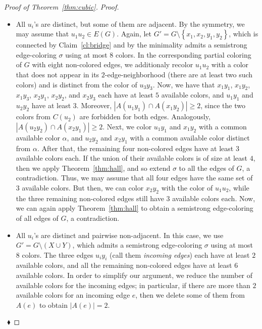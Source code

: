 \documentclass[12pt,a4paper]{article}
\newcommand{\set}[1]{\ensuremath{\left\{#1 \right\}}}
\newenvironment{proofclaim}[1][]%
    {\noindent \emph{Proof.} {}{#1}{}}{$~$\hfill $~\blacklozenge$ \vspace{0.2cm}}
\begin{document}
\begin{proof}[Proof of Theorem~\ref{thm:cubic}]
\begin{proofclaim}
\begin{itemize}
			\item[$(ii)$] All $u_i$'s are distinct, but some of them are adjacent. 
				By the symmetry, we may assume that $u_1u_2 \in E(G)$. 
				Again, let $G'=G \setminus \set{x_1,x_2,y_1,y_2}$, which is connected by Claim~\ref{cl:bridge} 
				and by the minimality admits a semistrong edge-coloring $\sigma$ using at most 8 colors. 				
				In the corresponding partial coloring of $G$ with eight non-colored edges, 
				we additionaly recolor $u_1u_2$ with a color that does not appear in its $2$-edge-neighborhood  
				(there are at least two such colors) and is distinct from the color of $u_3y_3$.
				Now, we have that $x_1y_1$, $x_1y_2$, $x_1y_3$, $x_2y_1$, $x_2y_2$, and $x_2y_3$ each have at least $5$ available colors, 
				and $u_1y_1$ and $u_2y_2$ have at least $3$. 
				Moreover, $|A(u_1y_1) \cap A(x_1y_2)| \ge 2$, since the two colors from $C(u_2)$ are forbidden for both edges. 
				Analogously, $|A(u_2y_2) \cap A(x_2y_1)| \ge 2$. 
				Next, we color $u_1y_1$ and $x_1y_2$ with a common available color $\alpha$, 
				and $u_2y_2$ and $x_2y_1$ with a common available color distinct from $\alpha$. 				
				After that, the remaining four non-colored edges have at least $3$ available colors each.
				If the union of their available colors is of size at least $4$, then we apply Theorem~\ref{thm:hall},
				and so extend $\sigma$ to all the edges of $G$, a contradiction.
				Thus, we may assume that all four edges have the same set of $3$ available colors.
				But then, we can color $x_2y_2$ with the color of $u_1u_2$, while the three remaining non-colored edges 
				still have $3$ available colors each.
				Now, we can again apply Theorem~\ref{thm:hall} to obtain a semistrong edge-coloring of all edges of $G$, a contradiction.
			
			\item[$(iii)$] All $u_i$'s are distinct and pairwise non-adjacent. 
				In this case, we use $G' = G \setminus (X \cup Y)$, 
				which admits a semistrong edge-coloring $\sigma$ using at most $8$ colors. 
				The three edges $u_iy_i$ (call them {\em incoming edges}) each have at least $2$ available colors,
				and all the remaining non-colored edges have at least $6$ available colors. 				
				In order to simplify our argument, we reduce the number of available colors for the incoming edges;
				in particular, if there are more than $2$ available colors for an incoming edge $e$, 
				then we delete some of them from $A(e)$ to obtain $|A(e)| = 2$.
				

\end{itemize}
\end{proofclaim}
\end{proof}
\end{document}
